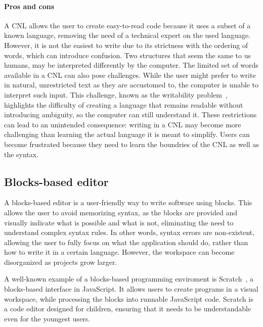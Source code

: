 \documentclass[11pt,a4paper]{report}
\begin{document}
\paragraph{Pros and cons}
A CNL allows the user to create easy-to-read code because it uses a subset of a known language, removing the need of a technical expert on the used language. However, it is not the easiest to write due to its strictness with the ordering of words, which can introduce confusion. Two structures that seem the same to us humans, may be interpreted differently by the computer. The limited set of words available in a CNL can also pose challenges. While the user might prefer to write in natural, unrestricted text as they are accustomed to, the computer is unable to interpret such input. This challenge, known as the writability problem~\cite{CNL}, highlights the difficulty of creating a language that remains readable without introducing ambiguity, so the computer can still understand it.
These restrictions can lead to an unintended consequence: writing in a CNL may become more challenging than learning the actual language it is meant to simplify. Users can become frustrated because they need to learn the boundries of the CNL as well as the syntax.

\subsection{Blocks-based editor}
A blocks-based editor is a user-friendly way to write software using blocks. This allows the user to avoid memorizing syntax, as the blocks are provided and visually indicate what is possible and what is not, eliminating the need to understand complex syntax rules. In other words, syntax errors are non-existent, allowing the user to fully focus on what the application should do, rather than how to write it in a certain language. However, the workspace can become disorganized as projects grow larger.

A well-known example of a blocks-based programming enviroment is Scratch~\cite{scratch}, a blocks-based interface in JavaScript. It allows users to create programs in a visual workspace, while processing the blocks into runnable JavaScript code. Scratch is a code editor designed for children, ensuring that it needs to be understandable even for the youngest users.
\end{document}
